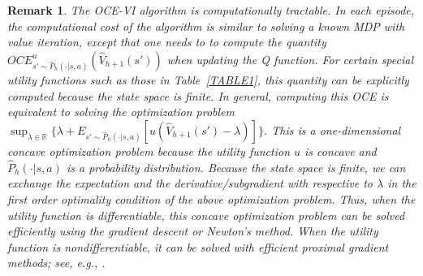 \documentclass[11pt]{article}
\newtheorem{remark}{Remark}
\newcommand{\1}{\mathbbm{1}}
\begin{document}
\begin{remark}
The OCE-VI algorithm is computationally tractable. In each episode, the computational cost of the algorithm is similar to solving a known MDP with value iteration, except that one needs to to compute the quantity $OCE^{u}_{s'\sim \hat{P}_h(\cdot\vert s,a)}(\hat{V}_{h+1}(s'))$ when updating the Q function. For certain special utility functions such as those in Table~\ref{TABLE1}, this quantity can be explicitly computed because the state space is finite. In general, computing this OCE is equivalent to solving the optimization problem $\sup_{\lambda\in \mathbb{R}}\{\lambda+E_{s'\sim\hat{P}_h(\cdot\vert s,a)}[u(\hat{V}_{h+1}(s')-\lambda)]\}$. This is a one-dimensional concave optimization problem because the utility function $u$ is concave and $\hat{P}_h(\cdot \vert s,a)$ is a probability distribution. Because the state space is finite, we can exchange the expectation and the derivative/subgradient with respective to $\lambda$ in the first order optimality condition of the above optimization problem. 
Thus, when the utility function is differentiable, this concave optimization problem can be solved efficiently using the gradient descent or Newton's method. When the utility function is nondifferentiable, it can be solved with efficient proximal gradient methods; see, e.g., \cite{parikh2014proximal}.




\end{remark}
\end{document}
